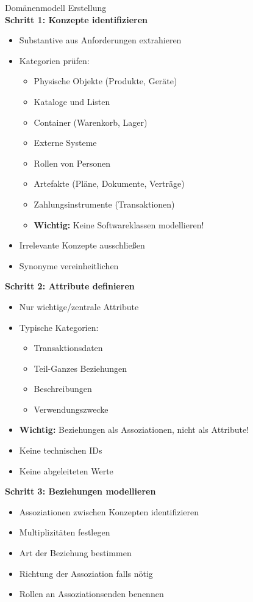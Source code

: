 \begin{KR}{Domänenmodell Erstellung}\\
\textbf{Schritt 1: Konzepte identifizieren}
\begin{itemize}
    \item Substantive aus Anforderungen extrahieren
    \item Kategorien prüfen:
    \begin{itemize}
        \item Physische Objekte (Produkte, Geräte)
        \item Kataloge und Listen
        \item Container (Warenkorb, Lager)
        \item Externe Systeme
        \item Rollen von Personen
        \item Artefakte (Pläne, Dokumente, Verträge)
        \item Zahlungsinstrumente (Transaktionen)
        \item \textbf{Wichtig:} Keine Softwareklassen modellieren!
    \end{itemize}
    \item Irrelevante Konzepte ausschließen
    \item Synonyme vereinheitlichen
\end{itemize}

\textbf{Schritt 2: Attribute definieren}
\begin{itemize}
    \item Nur wichtige/zentrale Attribute
    \item Typische Kategorien:
    \begin{itemize}
        \item Transaktionsdaten
        \item Teil-Ganzes Beziehungen
        \item Beschreibungen
        \item Verwendungszwecke
    \end{itemize}
    \item \textbf{Wichtig:} Beziehungen als Assoziationen, nicht als Attribute!
    \item Keine technischen IDs
    \item Keine abgeleiteten Werte
\end{itemize}

\textbf{Schritt 3: Beziehungen modellieren}
\begin{itemize}
    \item Assoziationen zwischen Konzepten identifizieren
    \item Multiplizitäten festlegen
    \item Art der Beziehung bestimmen
    \item Richtung der Assoziation falls nötig
    \item Rollen an Assoziationsenden benennen
\end{itemize}
\end{KR}






